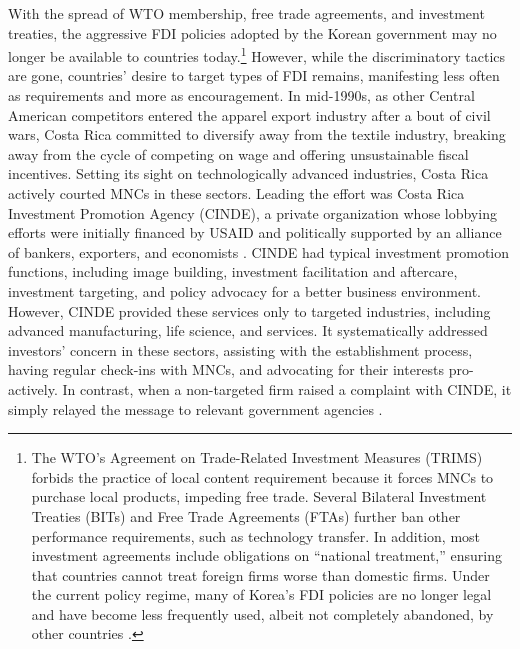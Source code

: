 With the spread of WTO membership, free trade agreements, and investment
treaties, the aggressive FDI policies adopted by the Korean government may no
longer be available to countries today.\footnote{The WTO's Agreement on
  Trade-Related Investment Measures (TRIMS) forbids the practice of local
  content requirement because it forces MNCs to purchase local products,
  impeding free trade. Several Bilateral Investment Treaties (BITs) and Free
  Trade Agreements (FTAs) further ban other performance requirements, such as
  technology transfer. In addition, most investment agreements include
  obligations on ``national treatment,'' ensuring that countries cannot treat
  foreign firms worse than domestic firms. Under the current policy regime, many
  of Korea's FDI policies are no longer legal and have become less frequently
  used, albeit not completely abandoned, by other countries \citep{Cosbey2015}.}
However, while the discriminatory tactics are gone, countries' desire to target
types of FDI remains, manifesting less often as requirements and more as
encouragement. In mid-1990s, as other Central American competitors entered the
apparel export industry after a bout of civil wars, Costa Rica committed to
diversify away from the textile industry, breaking away from the cycle of
competing on wage and offering unsustainable fiscal incentives. Setting its
sight on technologically advanced industries, Costa Rica actively courted MNCs
in these sectors. Leading the effort was Costa Rica Investment Promotion Agency
(CINDE), a private organization whose lobbying efforts were initially financed
by USAID and politically supported by an alliance of bankers, exporters, and
economists \citep{Clark1995}. CINDE had typical investment promotion functions,
including image building, investment facilitation and aftercare, investment
targeting, and policy advocacy for a better business environment. However, CINDE
provided these services only to targeted industries, including advanced
manufacturing, life science, and services. It systematically addressed
investors' concern in these sectors, assisting with the establishment
process, having regular check-ins with MNCs, and advocating for their interests
pro-actively. In contrast, when a non-targeted firm raised a complaint with
CINDE, it simply relayed the message to relevant government agencies
\citep{OECD2013}.

